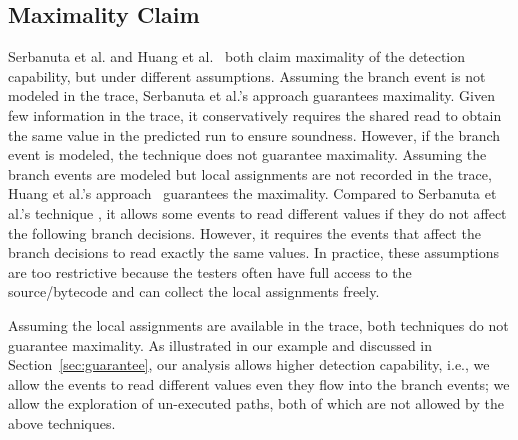 \subsection{Maximality Claim}
Serbanuta et al. \cite{maximal} and Huang et al.~\cite{HuangMR14} both claim maximality of the detection capability, but under different assumptions. 
Assuming the branch event is not modeled in the trace, Serbanuta et al.'s approach \cite{maximal} guarantees maximality. Given few information in the trace, it conservatively requires the shared read to obtain the same value in the predicted run to ensure soundness. However, if the branch event is modeled, the technique does not guarantee maximality.   
Assuming the branch events are modeled but local assignments are not recorded in the trace, Huang et al.'s approach~\cite{HuangMR14} guarantees the maximality. Compared to Serbanuta et al.'s technique \cite{maximal}, it allows some events to read different values if they do not affect the following branch decisions. However, it requires the events that affect the branch decisions to read exactly the same values. In practice, these assumptions are too restrictive  because the testers often have full access to the source/bytecode and can collect the local assignments freely.  

Assuming the local assignments are available in the trace, both techniques do not guarantee maximality. As illustrated in our example and discussed in Section~\ref{sec:guarantee}, our analysis allows higher detection capability, i.e., we allow the events to read different values even they flow into the branch events; we allow the exploration of un-executed paths, both of which are not allowed by the above techniques.
 


